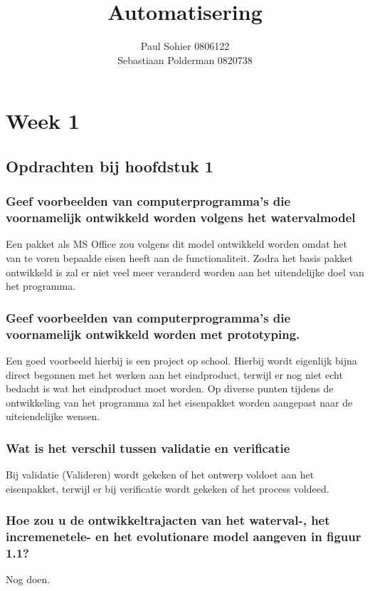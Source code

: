 \documentclass[a4paper,titlepage]{artikel1}
\author{Paul Sohier 0806122\\Sebastiaan Polderman 0820738}
\title{Automatisering}
\begin{document}
\maketitle
\tableofcontents
\newpage
 \section{Week 1}
  \subsection{Opdrachten bij hoofdstuk 1}
   \subsubsection[Opdracht 1]{Geef voorbeelden van computerprogramma's die voornamelijk ontwikkeld worden volgens het watervalmodel}
   Een pakket als MS Office zou volgens dit model ontwikkeld worden omdat het van te voren bepaalde eisen heeft aan de functionaliteit. 
   Zodra het basis pakket ontwikkeld is zal er niet veel meer veranderd worden aan het uitendelijke doel van het programma.
   
   \subsubsection[Opdracht 2]{Geef voorbeelden van computerprogramma's die voornamelijk ontwikkeld worden met prototyping.}
   Een goed voorbeeld hierbij is een project op school. Hierbij wordt eigenlijk bijna direct begonnen met het werken aan het eindproduct, terwijl er nog niet echt bedacht is wat het eindproduct moet worden. Op diverse punten tijdens de ontwikkeling van het programma zal het eisenpakket worden aangepast naar de uiteiendelijke wensen.
   
   \subsubsection[Opdracht 3]{Wat is het verschil tussen validatie en verificatie}
   Bij validatie (Valideren) wordt gekeken of het ontwerp voldoet aan het eisenpakket, terwijl er bij verificatie wordt gekeken of het process voldeed.
   
   \subsubsection[Opdracht 4]{Hoe zou u de ontwikkeltrajacten van het waterval-, het incremenetele- en het evolutionare model aangeven in figuur 1.1?}
   Nog doen.
   
\end{document}
